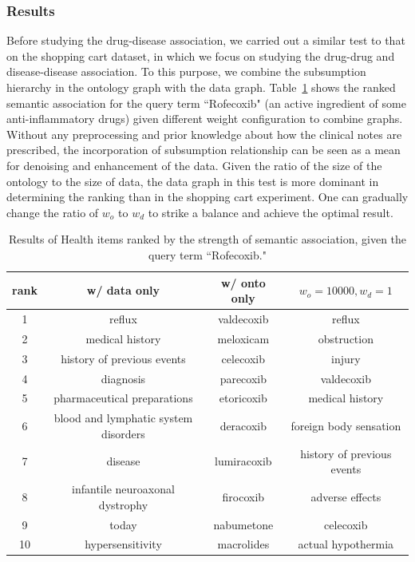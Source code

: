\subsubsection{Results}
Before studying the drug-disease association, we carried out a similar test to that on the shopping cart dataset, in which we focus on studying the drug-drug and disease-disease association. To this purpose, we combine the subsumption hierarchy in the ontology graph with the data graph. Table~\ref{tbl:health_comp} shows the ranked semantic association for the query term ``Rofecoxib" (an active ingredient of some anti-inflammatory drugs) given different weight configuration to combine graphs. Without any preprocessing and prior knowledge about how the clinical notes are prescribed, the incorporation of subsumption relationship can be seen as a mean for denoising and enhancement of the data. Given the ratio of the size of the ontology to the size of data, the data graph in this test is more dominant in determining the ranking than in the shopping cart experiment. One can gradually change the ratio of $w_o$ to $w_d$ to strike a balance and achieve the optimal result.
\begin{table}[tbh]\scriptsize
\begin{center}
\begin{tabular}{ c | c | c | c  }
\hline
rank    &   w/ data only	&	w/ onto only		&$w_o=10000, w_d=1$	 \\
\hline
1	&		reflux	&	valdecoxib	&		reflux	\\
2	&		medical history	&	meloxicam	&		obstruction	\\
3	&		history of previous events	&	celecoxib	&		injury	\\
4	&		diagnosis	&	parecoxib	&		valdecoxib	\\
5	&		pharmaceutical preparations	&	etoricoxib	&		medical history	\\
6	&		blood and lymphatic system disorders	&	deracoxib	&		foreign body sensation	\\
7	&		disease	&	lumiracoxib	&		history of previous events	\\
8	&		infantile neuroaxonal dystrophy	&	firocoxib	&		adverse effects	\\
9	&		today	&	nabumetone	&		celecoxib	\\
10	&		hypersensitivity	&	macrolides	&		actual hypothermia	\\
\hline
\end{tabular}
\end{center}
\caption[Top results on the electronic health dataset.]{\label{tbl:health_comp}Results of Health items ranked by the strength of semantic association, given the query term ``Rofecoxib."}
\end{table}


